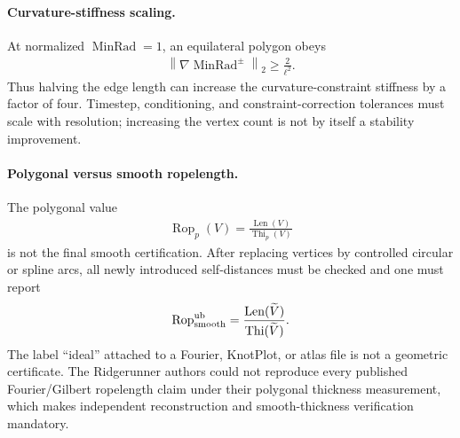 \paragraph{Curvature-stiffness scaling.}
At normalized $\operatorname{MinRad}=1$, an equilateral polygon obeys
\begin{align}
    \left\|\nabla\operatorname{MinRad}^{\pm}\right\|_2
    \ge
    \frac{2}{\ell^2} .
    \label{eq:rt_minrad_stiffness_scaling}
\end{align}
Thus halving the edge length can increase the curvature-constraint stiffness
by a factor of four.  Timestep, conditioning, and constraint-correction
tolerances must scale with resolution; increasing the vertex count is not by
itself a stability improvement.

\paragraph{Polygonal versus smooth ropelength.}
The polygonal value
\begin{align}
    \operatorname{Rop}_p(V)
    =
    \frac{\operatorname{Len}(V)}{\operatorname{Thi}_p(V)}
    \label{eq:rt_polygonal_ropelength}
\end{align}
is not the final smooth certification.  After replacing vertices by controlled
circular or spline arcs, all newly introduced self-distances must be checked
and one must report
\begin{align}
    \operatorname{Rop}_{\rm smooth}^{\rm ub}
    =
    \frac{\operatorname{Len}(\widetilde V)}
         {\operatorname{Thi}(\widetilde V)} .
    \label{eq:rt_smooth_ropelength_upper_bound}
\end{align}
The label ``ideal'' attached to a Fourier, KnotPlot, or atlas file is not a
geometric certificate.  The Ridgerunner authors could not reproduce every
published Fourier/Gilbert ropelength claim under their polygonal thickness
measurement, which makes independent reconstruction and smooth-thickness
verification mandatory.

